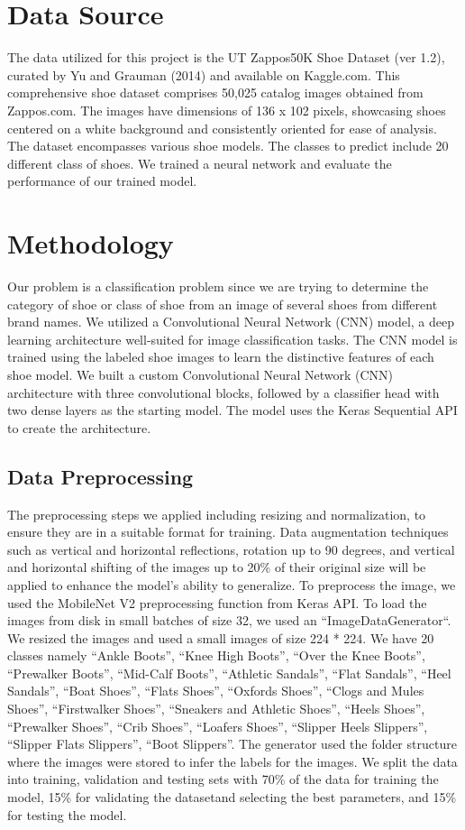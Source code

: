 \documentclass[11pt,a4paper]{article}
\begin{document}
\section{Data Source} 
The data utilized for this project is the UT Zappos50K Shoe Dataset (ver 1.2), curated by Yu and Grauman (2014) and available on Kaggle.com. This comprehensive shoe dataset comprises 50,025 catalog images obtained from Zappos.com. The images have dimensions of 136 x 102 pixels, showcasing shoes centered on a white background and consistently oriented for ease of analysis. The dataset encompasses various shoe models. The classes to predict include 20 different class of shoes. We trained a neural network and evaluate the performance of our trained model.  
		
\section{Methodology} 
Our problem is a classification problem since we are trying to determine the category of shoe or class of shoe from an image of several shoes from different brand names. We utilized a Convolutional Neural Network (CNN) model, a deep learning architecture well-suited for image classification tasks. The CNN model is trained using the labeled shoe images to learn the distinctive features of each shoe model. We built a custom Convolutional Neural Network (CNN) architecture with three convolutional blocks, followed by a classifier head with two dense layers as the starting model. The model uses the Keras Sequential API to create the architecture.

\subsection{Data Preprocessing}
The preprocessing steps we applied including resizing and normalization, to ensure they are in a suitable format for training. Data augmentation techniques such as vertical and horizontal reflections, rotation up to 90 degrees, and vertical and horizontal shifting of the images up to 20\% of their original size will be applied to enhance the model's ability to generalize.  To preprocess the image, we used the MobileNet V2 preprocessing function from Keras API.  To load the images from disk in small batches of size 32, we used an ``ImageDataGenerator``.  We resized the images and used a small images of size 224 * 224. We have 20 classes namely ``Ankle Boots'', ``Knee High Boots'', ``Over the Knee Boots'', ``Prewalker Boots'', ``Mid-Calf Boots'', ``Athletic Sandals'', ``Flat Sandals'', ``Heel Sandals'', ``Boat Shoes'', ``Flats Shoes'', ``Oxfords Shoes'', ``Clogs and Mules Shoes'',  ``Firstwalker Shoes'', ``Sneakers and Athletic Shoes'', ``Heels Shoes'', ``Prewalker Shoes'', ``Crib Shoes'', ``Loafers Shoes'', ``Slipper Heels Slippers'', ``Slipper Flats Slippers'', ``Boot Slippers''. The generator used the folder structure where the images were stored to infer the labels for the images. We split the data into training, validation and testing sets with 70\% of the data for training the model, 15\% for validating the datasetand selecting the best parameters, and 15\% for testing the model. 
\end{document}

